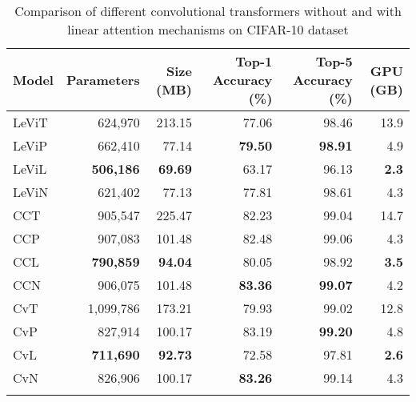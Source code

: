 \documentclass{article}
\begin{document}
\begin{table*}[h]
\centering
\begin{tabular}{lrrrrr}
\hline
\textbf{Model} & \textbf{Parameters} & \textbf{Size (MB)} & \textbf{Top-1 Accuracy (\%)} & \textbf{Top-5 Accuracy (\%)} & \textbf{GPU (GB)} \\

\hline
LeViT & 624,970 & 213.15 & 77.06 & 98.46 & 13.9 \\
LeViP & 662,410 & 77.14 & \textbf{79.50} & \textbf{98.91} & 4.9 \\
LeViL & \textbf{506,186} & \textbf{69.69} & 63.17 & 96.13 & \textbf{2.3} \\
LeViN & 621,402 & 77.13 & 77.81 & 98.61 & 4.3 \\ \hline
CCT & 905,547 & 225.47 & 82.23 & 99.04 & 14.7 \\
CCP & 907,083 & 101.48 & 82.48 & 99.06 & 4.3 \\
CCL & \textbf{790,859} & \textbf{94.04} & 80.05 & 98.92 & \textbf{3.5} \\
CCN & 906,075 & 101.48 & \textbf{83.36} & \textbf{99.07} & 4.2 \\ \hline
CvT & 1,099,786 & 173.21 & 79.93 & 99.02 & 12.8 \\
CvP & 827,914 & 100.17 & 83.19 & \textbf{99.20} & 4.8 \\
CvL & \textbf{711,690} & \textbf{92.73} & 72.58 & 97.81 & \textbf{2.6} \\
CvN & 826,906 & 100.17 & \textbf{83.26} & 99.14 & 4.3 \\ \hline \\
\end{tabular}

\caption{Comparison of different convolutional transformers without and with linear attention mechanisms on CIFAR-10 dataset}
\label{tab:cifLeV}
\end{table*}
\end{document}
